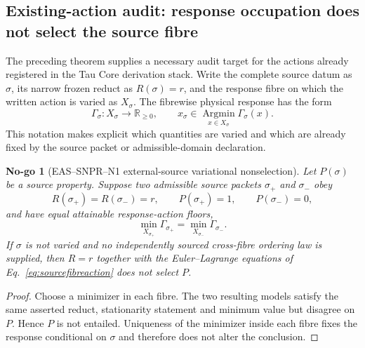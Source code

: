\documentclass[11pt,a4paper]{article}
\newtheorem{nogo}[definition]{No-go}
\theoremstyle{remark}
\begin{document}
\subsection{Existing-action audit: response occupation does not select the source fibre}

The preceding theorem supplies a necessary audit target for the actions
already registered in the Tau Core derivation stack.  Write the complete
source datum as $\sigma$, its narrow frozen reduct as $R(\sigma)=r$, and the
response fibre on which the written action is varied as $X_\sigma$.  The
fibrewise physical response has the form
\begin{equation}
 \Gamma_\sigma:X_\sigma\longrightarrow\mathbb R_{\geq0},
 \qquad
 x_\sigma\in\operatorname*{Argmin}_{x\in X_\sigma}\Gamma_\sigma(x).
 \label{eq:sourcefibreaction}
\end{equation}
This notation makes explicit which quantities are varied and which are
already fixed by the source packet or admissible-domain declaration.

\begin{nogo}[EAS--SNPR--N1 external-source variational nonselection]
Let $P(\sigma)$ be a source property.  Suppose two admissible source packets
$\sigma_+$ and $\sigma_-$ obey
\begin{equation}
 R(\sigma_+)=R(\sigma_-)=r,
 \qquad P(\sigma_+)=1,
 \qquad P(\sigma_-)=0,
 \label{eq:samesourcereduct}
\end{equation}
and have equal attainable response-action floors,
\begin{equation}
 \min_{X_{\sigma_+}}\Gamma_{\sigma_+}
 =\min_{X_{\sigma_-}}\Gamma_{\sigma_-}.
 \label{eq:samefibrefloor}
\end{equation}
If $\sigma$ is not varied and no independently sourced cross-fibre ordering
law is supplied, then $R=r$ together with the Euler--Lagrange equations of
Eq.~\eqref{eq:sourcefibreaction} does not select $P$.
\label{nogo:snprvariationaldomain}
\end{nogo}

\begin{proof}
Choose a minimizer in each fibre.  The two resulting models satisfy the same
asserted reduct, stationarity statement and minimum value but disagree on
$P$.  Hence $P$ is not entailed.  Uniqueness of the minimizer inside each
fibre fixes the response conditional on $\sigma$ and therefore does not alter
the conclusion.
\end{proof}
\end{document}

